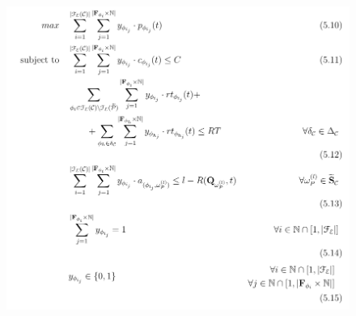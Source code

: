 \documentclass[13.5pt]{beamer}
\begin{document}
\begin{frame}
	
\begin{figure}[h]
	\centering
	\includegraphics[width=\textwidth,height=0.8\columnwidth]{../Images/MMKPForSlide.png}
\end{figure}
	
	
\end{frame}
\end{document}
